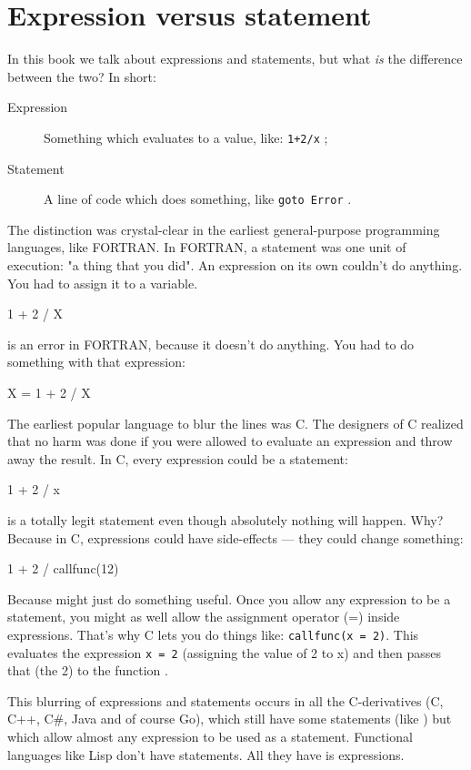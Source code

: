 \section{Expression versus statement}
\label{sec:expression versus statement}
In this book we talk about expressions and statements, but%
what \emph{is} the difference between the two?
In short:
\begin{description}
\item[Expression] Something which evaluates to a value, like:
\lstinline{1+2/x} ;
\item[Statement] A line of code which does something, like
\lstinline{goto Error} .
\end{description}

The distinction was crystal-clear in the earliest general-purpose
programming languages, like FORTRAN. In FORTRAN, a statement was one
unit of execution: "a thing that you did". 
An expression on its own couldn't do anything. You had to assign it to a
variable.
\begin{display}
1 + 2 / X
\end{display}
is an error in FORTRAN, because it doesn't do anything. You had to do
something with that expression: 
\begin{display}{X = 1 + 2 / X}\end{display}

The earliest popular language to blur the lines was C. The designers of
C realized that no harm was done if you were allowed to evaluate an
expression and throw away the result. In C, every expression could be a
statement: 
\begin{display}1 + 2 / x\end{display}
is a totally legit statement even though absolutely nothing will happen.
Why? Because in C, expressions could have side-effects --- they could
change something: \begin{display}{1 + 2 / callfunc(12)}\end{display}

Because  might just do something useful.
Once you allow any expression to be a statement, you might as well allow
the assignment operator (=) inside expressions. That's why C lets you do
things like: \lstinline{callfunc(x = 2)}.
This evaluates the expression \lstinline{x = 2} (assigning the value of 2 to x) and
then passes that (the 2) to the function .

This blurring of expressions and statements occurs in all the
C-derivatives (C, C++, C\#, Java and of course Go), which still have some
statements (like ) but which allow almost any expression to be used
as a statement. Functional languages like Lisp don't have statements.
All they have is expressions. 
